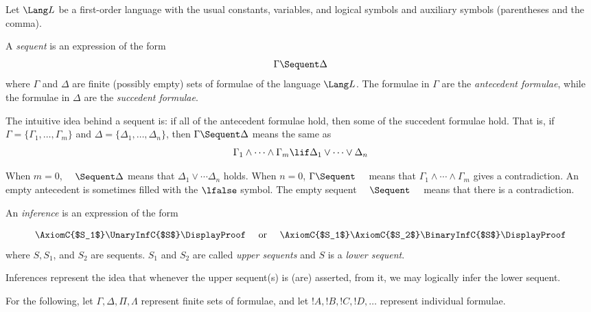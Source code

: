 \documentclass[../../include/open-logic-section]{subfiles}
\begin{document}


Let $\Lang L$ be a first-order language with the usual constants, variables, and logical symbols and auxiliary symbols (parentheses and the comma). 

\begin{defn}[sequent]
A \emph{sequent} is an expression of the form
\[ \Gamma \Sequent \Delta \]
where $\Gamma$ and $\Delta$ are finite (possibly empty) sets of formulae of the language $\Lang L$. The formulae in $\Gamma$ are the \emph{antecedent formulae}, while the formulae in $\Delta$ are the \emph{succedent formulae}. 

The intuitive idea behind a sequent is: if all of the antecedent formulae hold, then some of the succedent formulae hold. That is, if $\Gamma = \{ \Gamma_1,\ldots,\Gamma_m\}$ and $\Delta = \{ \Delta_1,\ldots, \Delta_n\}$, then $\Gamma \Sequent \Delta$ means the same as 
\[ \Gamma_1 \land \cdots \land \Gamma_m \lif \Delta_1 \lor \cdots \lor \Delta_n \]

When $m=0$, $\hspace{1em} \Sequent \Delta$ means that $\Delta_1 \lor \cdots \Delta_n$ holds. When $n=0$, $\Gamma \Sequent \hspace{1em}$ means that $\Gamma_1 \land \cdots \land \Gamma_m$ gives a contradiction. An empty antecedent is sometimes filled with the $\lfalse$ symbol. The empty sequent $\hspace{1em} \Sequent \hspace{1em}$ means that there is a contradiction.
\end{defn}

\begin{defn}[Inference]
An \emph{inference} is an expression of the form

\[
\AxiomC{$S_1$}
\UnaryInfC{$S$}
\DisplayProof
\quad
\textrm{  or  }
\quad
\AxiomC{$S_1$}
\AxiomC{$S_2$}
\BinaryInfC{$S$}
\DisplayProof
\]
where $S, S_1$, and $S_2$ are sequents. $S_1$ and $S_2$ are called \emph{upper sequents} and $S$ is a \emph{lower sequent}.

Inferences represent the idea that whenever the upper sequent(s) is (are) asserted, from it, we may logically infer the lower sequent.
\end{defn}

For the following, let $\Gamma, \Delta, \Pi, \Lambda$ represent finite sets of formulae, and let $!A, !B, !C, !D, \ldots$ represent individual formulae.
\end{document}
